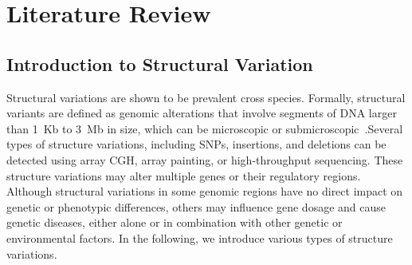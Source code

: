 \graphicspath{ {Chapters/images/} }

\chapter{Literature Review}
\section{Introduction to Structural Variation}

Structural variations are shown to be prevalent cross species. Formally, structural variants are defined as genomic alterations that involve segments of DNA larger than 1~Kb to 3~Mb in size, which can be microscopic or submicroscopic~\cite{Sharp2006}.Several types of structure variations, including SNPs, insertions, and deletions can be detected using array CGH, array painting, or high-throughput sequencing. These structure variations
may alter multiple genes or their regulatory regions. Although structural variations in some genomic regions have no direct impact
on genetic or phenotypic differences, others may influence gene
dosage and cause genetic diseases, either alone or in combination
with other genetic or environmental factors.
In the following, we introduce various types of structure variations.

